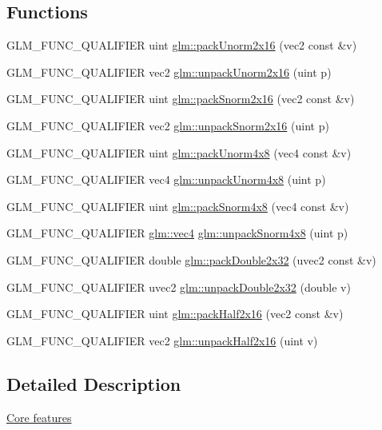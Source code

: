 \subsection*{Functions}
\begin{DoxyCompactItemize}
\item 
G\+L\+M\+\_\+\+F\+U\+N\+C\+\_\+\+Q\+U\+A\+L\+I\+F\+I\+ER uint \hyperlink{group__core__func__packing_ga0e2d107039fe608a209497af867b85fb}{glm\+::pack\+Unorm2x16} (vec2 const \&v)
\item 
G\+L\+M\+\_\+\+F\+U\+N\+C\+\_\+\+Q\+U\+A\+L\+I\+F\+I\+ER vec2 \hyperlink{group__core__func__packing_ga1f66188e5d65afeb9ffba1ad971e4007}{glm\+::unpack\+Unorm2x16} (uint p)
\item 
G\+L\+M\+\_\+\+F\+U\+N\+C\+\_\+\+Q\+U\+A\+L\+I\+F\+I\+ER uint \hyperlink{group__core__func__packing_ga977ab172da5494e5ac63e952afacfbe2}{glm\+::pack\+Snorm2x16} (vec2 const \&v)
\item 
G\+L\+M\+\_\+\+F\+U\+N\+C\+\_\+\+Q\+U\+A\+L\+I\+F\+I\+ER vec2 \hyperlink{group__core__func__packing_gacd8f8971a3fe28418be0d0fa1f786b38}{glm\+::unpack\+Snorm2x16} (uint p)
\item 
G\+L\+M\+\_\+\+F\+U\+N\+C\+\_\+\+Q\+U\+A\+L\+I\+F\+I\+ER uint \hyperlink{group__core__func__packing_gaf7d2f7341a9eeb4a436929d6f9ad08f2}{glm\+::pack\+Unorm4x8} (vec4 const \&v)
\item 
G\+L\+M\+\_\+\+F\+U\+N\+C\+\_\+\+Q\+U\+A\+L\+I\+F\+I\+ER vec4 \hyperlink{group__core__func__packing_ga7f903259150b67e9466f5f8edffcd197}{glm\+::unpack\+Unorm4x8} (uint p)
\item 
G\+L\+M\+\_\+\+F\+U\+N\+C\+\_\+\+Q\+U\+A\+L\+I\+F\+I\+ER uint \hyperlink{group__core__func__packing_ga85e8f17627516445026ab7a9c2e3531a}{glm\+::pack\+Snorm4x8} (vec4 const \&v)
\item 
G\+L\+M\+\_\+\+F\+U\+N\+C\+\_\+\+Q\+U\+A\+L\+I\+F\+I\+ER \hyperlink{group__core__types_ga5881b1b022d7fd1b7218f5916532dd02}{glm\+::vec4} \hyperlink{group__core__func__packing_ga2db488646d48b7c43d3218954523fe82}{glm\+::unpack\+Snorm4x8} (uint p)
\item 
G\+L\+M\+\_\+\+F\+U\+N\+C\+\_\+\+Q\+U\+A\+L\+I\+F\+I\+ER double \hyperlink{group__core__func__packing_gaa916ca426b2bb0343ba17e3753e245c2}{glm\+::pack\+Double2x32} (uvec2 const \&v)
\item 
G\+L\+M\+\_\+\+F\+U\+N\+C\+\_\+\+Q\+U\+A\+L\+I\+F\+I\+ER uvec2 \hyperlink{group__core__func__packing_ga5f4296dc5f12f0aa67ac05b8bb322483}{glm\+::unpack\+Double2x32} (double v)
\item 
G\+L\+M\+\_\+\+F\+U\+N\+C\+\_\+\+Q\+U\+A\+L\+I\+F\+I\+ER uint \hyperlink{group__core__func__packing_ga20f134b07db3a3d3a38efb2617388c92}{glm\+::pack\+Half2x16} (vec2 const \&v)
\item 
G\+L\+M\+\_\+\+F\+U\+N\+C\+\_\+\+Q\+U\+A\+L\+I\+F\+I\+ER vec2 \hyperlink{group__core__func__packing_gaf59b52e6b28da9335322c4ae19b5d745}{glm\+::unpack\+Half2x16} (uint v)
\end{DoxyCompactItemize}


\subsection{Detailed Description}
\hyperlink{group__core}{Core features} 
